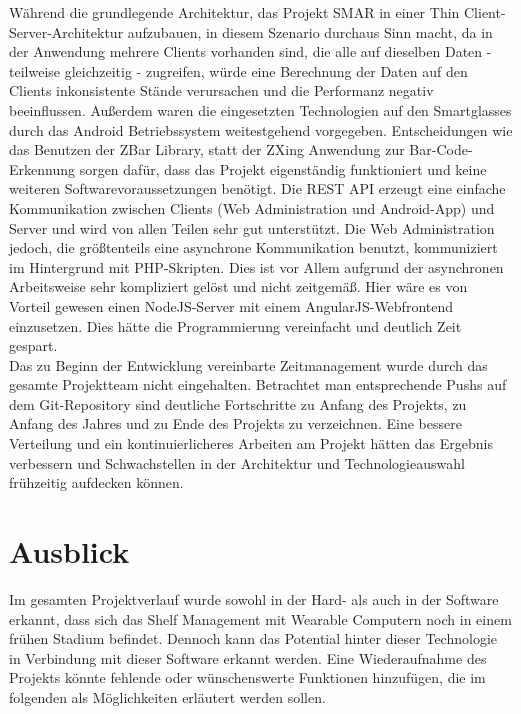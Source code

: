Während die grundlegende Architektur, das Projekt \ac{SMAR} in einer Thin Client-Server-Architektur aufzubauen, in diesem Szenario durchaus Sinn macht, da in der Anwendung mehrere Clients vorhanden sind, die alle auf dieselben Daten - teilweise gleichzeitig - zugreifen, würde eine Berechnung der Daten auf den Clients inkonsistente Stände verursachen und die Performanz negativ beeinflussen. Außerdem waren die eingesetzten Technologien auf den Smartglasses durch das Android Betriebssystem weitestgehend vorgegeben. Entscheidungen wie \zB das Benutzen der ZBar Library, statt der ZXing Anwendung zur Bar-Code-Erkennung sorgen dafür, dass das Projekt eigenständig funktioniert und keine weiteren Softwarevoraussetzungen benötigt. Die \ac{REST} \ac{API} erzeugt eine einfache Kommunikation zwischen Clients (Web Administration und Android-App) und Server und wird von allen Teilen sehr gut unterstützt. Die Web Administration jedoch, die größtenteils eine asynchrone Kommunikation benutzt, kommuniziert im Hintergrund mit PHP-Skripten. Dies ist vor Allem aufgrund der asynchronen Arbeitsweise sehr kompliziert gelöst und nicht zeitgemäß. Hier wäre es von Vorteil gewesen einen NodeJS-Server mit einem AngularJS-Webfrontend einzusetzen. Dies hätte die Programmierung vereinfacht und deutlich Zeit gespart.\\

Das zu Beginn der Entwicklung vereinbarte Zeitmanagement wurde durch das gesamte Projektteam nicht eingehalten. Betrachtet man entsprechende Pushs auf dem Git-Repository sind deutliche Fortschritte zu Anfang des Projekts, zu Anfang des Jahres und zu Ende des Projekts zu verzeichnen. Eine bessere Verteilung und ein kontinuierlicheres Arbeiten am Projekt hätten das Ergebnis verbessern und Schwachstellen in der Architektur und Technologieauswahl frühzeitig aufdecken können.

\chapter{Ausblick}
\label{cha:ausblick}
Im gesamten Projektverlauf wurde sowohl in der Hard- als auch in der Software erkannt, dass sich das Shelf Management mit Wearable Computern noch in einem frühen Stadium befindet. Dennoch kann das Potential hinter dieser Technologie in Verbindung mit dieser Software erkannt werden. Eine Wiederaufnahme des Projekts könnte fehlende oder wünschenswerte Funktionen hinzufügen, die im folgenden als Möglichkeiten erläutert werden sollen.\\

